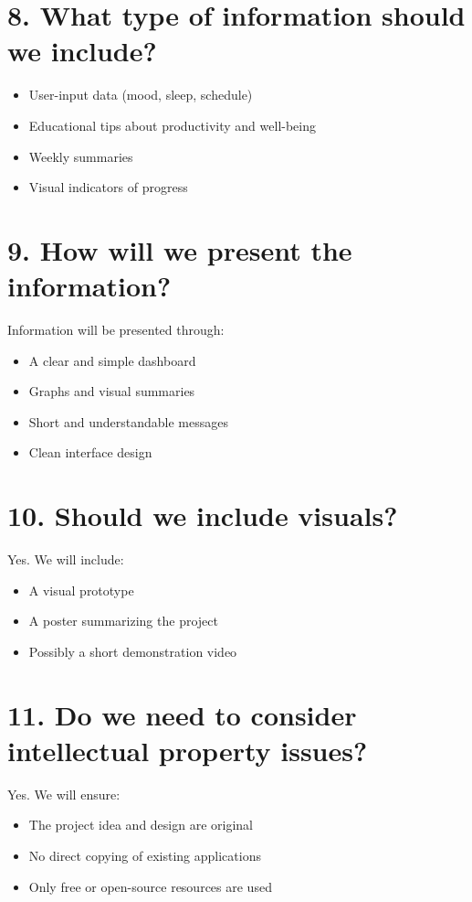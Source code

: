 \documentclass[11pt,a4paper]{article}
\begin{document}
\section*{8. What type of information should we include?}
\begin{itemize}
  \item User-input data (mood, sleep, schedule)
  \item Educational tips about productivity and well-being
  \item Weekly summaries
  \item Visual indicators of progress
\end{itemize}

\section*{9. How will we present the information?}
Information will be presented through:
\begin{itemize}
  \item A clear and simple dashboard
  \item Graphs and visual summaries
  \item Short and understandable messages
  \item Clean interface design
\end{itemize}

\section*{10. Should we include visuals?}
Yes. We will include:
\begin{itemize}
  \item A visual prototype
  \item A poster summarizing the project
  \item Possibly a short demonstration video
\end{itemize}

\section*{11. Do we need to consider intellectual property issues?}
Yes. We will ensure:
\begin{itemize}
  \item The project idea and design are original
  \item No direct copying of existing applications
  \item Only free or open-source resources are used
\end{itemize}
\end{document}
